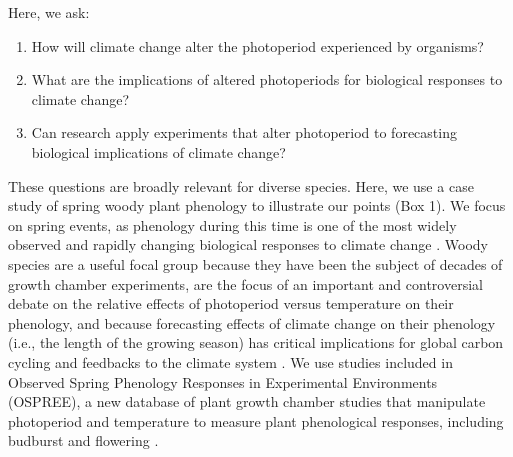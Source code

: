 \documentclass{article}
\begin{document}
\par Here, we ask: 
\begin{enumerate}
\item How will climate change alter the photoperiod experienced by organisms? 
\item What are the implications of altered photoperiods for biological responses to climate change?
\item Can research apply experiments that alter photoperiod to forecasting biological implications of climate change?

\end{enumerate}
\par These questions are broadly relevant for diverse species. Here, we use a case study of spring woody plant phenology to illustrate our points (Box 1). We focus on spring events, as phenology during this time is one of the most widely observed and rapidly changing biological responses to climate change \citep{parmesan2006}. Woody species are a useful focal group because they have been the subject of decades of growth chamber experiments, are the focus of an important and controversial debate on the relative effects of photoperiod versus temperature on their phenology, and because forecasting effects of climate change on their phenology (i.e., the length of the growing season) has critical implications for global carbon cycling and feedbacks to the climate system \citep{richardson2013}. We use studies included in Observed Spring Phenology Responses in Experimental Environments (OSPREE), a new database of plant growth chamber studies that manipulate photoperiod and temperature to measure plant phenological responses, including budburst and flowering \citep{wolkovich2019}.%
\end{document}
